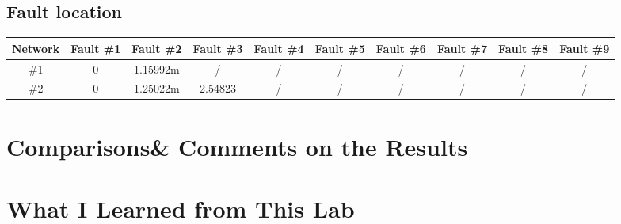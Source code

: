 \documentclass[11pt,oneside,a4paper]{report}
\begin{document}
\subsection*{Fault location}
\begin{table}[htbp]
\begin{tabular}{cccccccccc}
\toprule
Network & Fault \#1 & Fault \#2 & Fault \#3 & Fault \#4 & Fault \#5 & Fault \#6 & Fault \#7 & Fault \#8 & Fault \#9 \\
\midrule
\#1 & 0 & 1.15992m & / & / & / & / & / & / & / \\
\#2 & 0 & 1.25022m & 2.54823 & / & / & / & / & / & / 
\bottomrule
\end{tabular}
\end{table}

\section*{Comparisons\& Comments on the Results}

\section*{What I Learned from This Lab}
\end{document}
